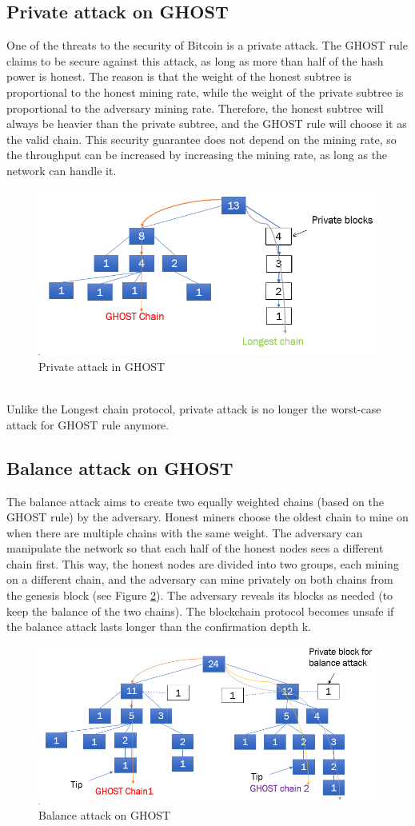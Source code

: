 \subsection{Private attack on GHOST}
One of the threats to the security of Bitcoin is a private attack. The GHOST rule claims to be secure against this attack, as long as more than half of the hash power is honest. The reason is that the weight of the honest subtree is proportional to the honest mining rate, while the weight of the private subtree is proportional to the adversary mining rate. Therefore, the honest subtree will always be heavier than the private subtree, and the GHOST rule will choose it as the valid chain. This security guarantee does not depend on the mining rate, so the throughput can be increased by increasing the mining rate, as long as the network can handle it.
\begin{figure}[h!]
    \centering
    \includegraphics[width=0.6\linewidth]{Fig/08/F2}
    \caption{Private attack in GHOST}
    \label{fig:f2}
\end{figure}\\
Unlike the Longest chain protocol, private attack is no longer the worst-case attack for GHOST rule anymore.
\subsection{Balance attack on GHOST}
The balance attack aims to create two equally weighted chains (based on the GHOST rule) by the adversary. Honest miners choose the oldest chain to mine on when there are multiple chains with the same weight. The adversary can manipulate the network so that each half of the honest nodes sees a different chain first. This way, the honest nodes are divided into two groups, each mining on a different chain, and the adversary can mine privately on both chains from the genesis block (see Figure \ref{fig:f3}). The adversary reveals its blocks as needed (to keep the balance of the two chains). The blockchain protocol becomes unsafe if the balance attack lasts longer than the confirmation depth k.
\begin{figure}[h!   ]
    \centering
    \includegraphics[width=0.7\linewidth]{Fig/08/F3}
    \caption{Balance attack on GHOST}
    \label{fig:f3}
\end{figure}

